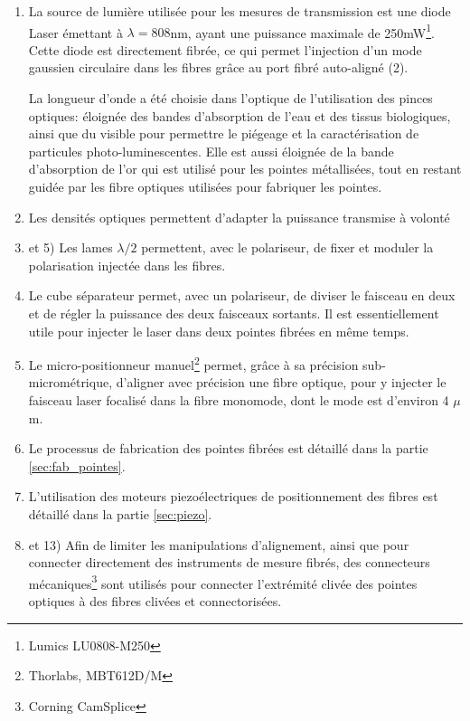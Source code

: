 \begin{enumerate}[{1)}]
    \item La source de lumière utilisée pour les mesures de transmission est une diode Laser émettant à $\lambda = 808$nm, ayant une puissance maximale de 250mW\footnote{Lumics LU0808-M250}. Cette diode est directement fibrée, ce qui permet l'injection d'un mode gaussien circulaire dans les fibres grâce au port fibré auto-aligné (2).

    La longueur d'onde a été choisie dans l'optique de l'utilisation des pinces optiques: éloignée des bandes d'absorption de l'eau et des tissus biologiques, ainsi que du visible pour permettre le piégeage et la caractérisation de particules photo-luminescentes. Elle est aussi éloignée de la bande d'absorption de l'or qui est utilisé pour les pointes métallisées, tout en restant guidée par les fibre optiques utilisées pour fabriquer les pointes.
\setcounter{enumi}{2}
    \item Les densités optiques permettent d'adapter la puissance transmise à volonté
    \item et 5) Les lames $\lambda/2$ permettent, avec le polariseur, de fixer et moduler la polarisation injectée dans les fibres.
\setcounter{enumi}{6}
    \item Le cube séparateur permet, avec un polariseur, de diviser le faisceau en deux et de régler la puissance des deux faisceaux sortants. Il est essentiellement utile pour injecter le laser dans deux pointes fibrées en même temps.
\setcounter{enumi}{8}
    \item Le micro-positionneur manuel\footnote{Thorlabs, MBT612D/M} permet, grâce à sa précision sub-micrométrique, d'aligner avec précision une fibre optique, pour y injecter le faisceau laser focalisé dans la fibre monomode, dont le mode est d'environ 4 $\mu$ m.
    \item Le processus de fabrication des pointes fibrées est détaillé dans la partie \ref{sec:fab_pointes}.
    \item L'utilisation des moteurs piezoélectriques de positionnement des fibres est détaillé dans la partie \ref{sec:piezo}.
    \item et 13) Afin de limiter les manipulations d'alignement, ainsi que pour connecter directement des instruments de mesure fibrés, des connecteurs mécaniques\footnote{Corning CamSplice} sont utilisés pour connecter l'extrémité clivée des pointes optiques à des fibres clivées et connectorisées.
\end{enumerate}

